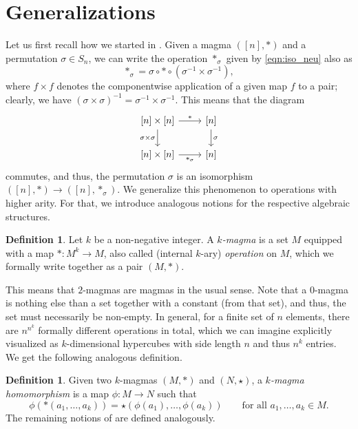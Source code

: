 \documentclass[12pt]{article}
\let\Cref\crtCref
\theoremstyle{definition}
\newtheorem{definition}[theorem]{Definition}
\theoremstyle{remark}
\begin{document}
	\section{Generalizations}\label{sec:gen}
	Let us first recall how we started in \Cref{sec:pot}. Given a magma $([n],\ast)$ and a permutation $\sigma \in S_n$, we can write the operation $\ast_{\sigma}$ given by \eqref{eqn:iso_neu} also as
	\[
	\ast_{\sigma} = \sigma\circ\ast\circ(\sigma^{-1} \times \sigma^{-1}),
	\]
	where $f \times f$ denotes the componentwise application of a given map $f$ to a pair; clearly, we have $(\sigma \times \sigma)^{-1} = \sigma^{-1} \times \sigma^{-1}$. This means that the diagram
	\begin{equation*}
	\begin{tikzcd}
	{[n] \times [n]} & {[n]} \\
	{[n] \times [n]} & {[n]}
	\arrow["\ast", from=1-1, to=1-2]
	\arrow["{\sigma\times\sigma}"', from=1-1, to=2-1]
	\arrow["\sigma", from=1-2, to=2-2]
	\arrow["{\ast_{\sigma}}"', from=2-1, to=2-2]
	\end{tikzcd}
	\end{equation*}
	commutes, and thus, the permutation $\sigma$ is an isomorphism $([n],\ast) \to ([n],\ast_{\sigma})$. We generalize this phenomenon to operations with higher arity. For that, we introduce analogous notions for the respective algebraic structures.
	\begin{definition}
		Let $k$ be a non-negative integer. A \emph{$k$-magma} is a set $M$ equipped with a map $\ast \colon M^k \to M$, also called (internal $k$-ary) \emph{operation} on $M$, which we formally write together as a pair $(M,\ast)$.
	\end{definition}
	This means that $2$-magmas are magmas in the usual sense. Note that a $0$-magma is nothing else than a set together with a constant (from that set), and thus, the set must necessarily be non-empty. In general, for a finite set of $n$ elements, there are $n^{n^k}$ formally different operations in total, which we can imagine explicitly visualized as $k$-dimensional hypercubes with side length $n$ and thus $n^k$ entries. We get the following analogous definition.
	\begin{definition}
	Given two $k$-magmas $(M,\ast)$ and $(N,\star)$, a \emph{$k$-magma homomorphism} is a map $\phi \colon M \to N$ such that
	\begin{equation}\label{eqn:homomorphism}
	\phi(\ast(a_1,\dots,a_k))=\star(\phi(a_1),\dots,\phi(a_k)) \qquad \text{for all } a_1,\dots,a_k \in M.
	\end{equation}
	The remaining notions of \Cref{def:morphisms} are defined analogously.
	\end{definition}
\end{document}
